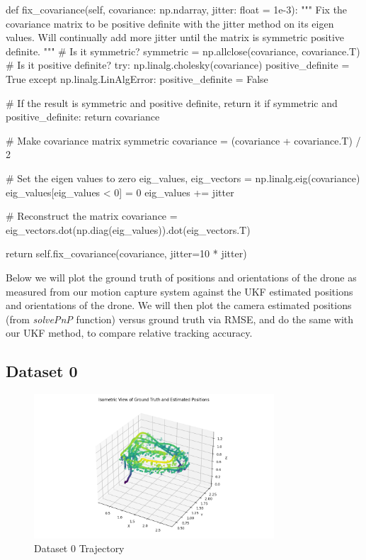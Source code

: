 \documentclass{article}
\begin{document}
\begin{python}
    def fix_covariance(self, covariance: np.ndarray, jitter: float = 1e-3):
    """
    Fix the covariance matrix to be positive definite with the
    jitter method on its eigen values. Will continually add more
    jitter until the matrix is symmetric positive definite.
    """
    # Is it symmetric?
    symmetric = np.allclose(covariance, covariance.T)
    # Is it positive definite?
    try:
    np.linalg.cholesky(covariance)
    positive_definite = True
    except np.linalg.LinAlgError:
    positive_definite = False

    # If the result is symmetric and positive definite, return it
    if symmetric and positive_definite:
    return covariance

    # Make covariance matrix symmetric
    covariance = (covariance + covariance.T) / 2

    # Set the eigen values to zero
    eig_values, eig_vectors = np.linalg.eig(covariance)
    eig_values[eig_values < 0] = 0
    eig_values += jitter

    # Reconstruct the matrix
    covariance = eig_vectors.dot(np.diag(eig_values)).dot(eig_vectors.T)

    return self.fix_covariance(covariance, jitter=10 * jitter)
\end{python}

Below we will plot the ground truth of positions and orientations of the drone as measured from our motion capture system against the UKF estimated positions and orientations of the drone. We will then plot the camera estimated positions (from \textit{solvePnP} function) versus ground truth via RMSE, and do the same with our UKF method, to compare relative tracking accuracy.

\subsection*{Dataset 0}

\begin{figure}[H]
    \centering
    \includegraphics[width=0.8\textwidth]{./imgs/task4/studentdata0_ukf_isometric.png}
    \caption{Dataset 0 Trajectory}
\end{figure}
\end{document}
